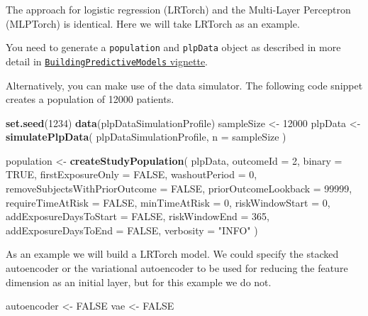 \documentclass[]{article}
\newenvironment{Shaded}{\begin{snugshade}}{\end{snugshade}}
\newcommand{\KeywordTok}[1]{\textcolor[rgb]{0.13,0.29,0.53}{\textbf{#1}}}
\newcommand{\DataTypeTok}[1]{\textcolor[rgb]{0.13,0.29,0.53}{#1}}
\newcommand{\DecValTok}[1]{\textcolor[rgb]{0.00,0.00,0.81}{#1}}
\newcommand{\StringTok}[1]{\textcolor[rgb]{0.31,0.60,0.02}{#1}}
\newcommand{\OtherTok}[1]{\textcolor[rgb]{0.56,0.35,0.01}{#1}}
\newcommand{\NormalTok}[1]{#1}
\begin{document}
The approach for logistic regression (LRTorch) and the Multi-Layer
Perceptron (MLPTorch) is identical. Here we will take LRTorch as an
example.

You need to generate a \texttt{population} and \texttt{plpData} object
as described in more detail in
\href{https://github.com/OHDSI/PatientLevelPrediction/blob/master/inst/doc/BuildingPredictiveModels.pdf}{\texttt{BuildingPredictiveModels}
vignette}.

Alternatively, you can make use of the data simulator. The following
code snippet creates a population of 12000 patients.

\begin{Shaded}
\begin{Highlighting}[]
\KeywordTok{set.seed}\NormalTok{(}\DecValTok{1234}\NormalTok{)}
\KeywordTok{data}\NormalTok{(plpDataSimulationProfile)}
\NormalTok{sampleSize <-}\StringTok{ }\DecValTok{12000}
\NormalTok{plpData <-}\StringTok{ }\KeywordTok{simulatePlpData}\NormalTok{(}
\NormalTok{  plpDataSimulationProfile,}
  \DataTypeTok{n =}\NormalTok{ sampleSize}
\NormalTok{)}

\NormalTok{population <-}\StringTok{ }\KeywordTok{createStudyPopulation}\NormalTok{(}
\NormalTok{  plpData,}
  \DataTypeTok{outcomeId =} \DecValTok{2}\NormalTok{,}
  \DataTypeTok{binary =} \OtherTok{TRUE}\NormalTok{,}
  \DataTypeTok{firstExposureOnly =} \OtherTok{FALSE}\NormalTok{,}
  \DataTypeTok{washoutPeriod =} \DecValTok{0}\NormalTok{,}
  \DataTypeTok{removeSubjectsWithPriorOutcome =} \OtherTok{FALSE}\NormalTok{,}
  \DataTypeTok{priorOutcomeLookback =} \DecValTok{99999}\NormalTok{,}
  \DataTypeTok{requireTimeAtRisk =} \OtherTok{FALSE}\NormalTok{,}
  \DataTypeTok{minTimeAtRisk =} \DecValTok{0}\NormalTok{,}
  \DataTypeTok{riskWindowStart =} \DecValTok{0}\NormalTok{,}
  \DataTypeTok{addExposureDaysToStart =} \OtherTok{FALSE}\NormalTok{,}
  \DataTypeTok{riskWindowEnd =} \DecValTok{365}\NormalTok{,}
  \DataTypeTok{addExposureDaysToEnd =} \OtherTok{FALSE}\NormalTok{,}
  \DataTypeTok{verbosity =} \StringTok{"INFO"}
\NormalTok{)}
\end{Highlighting}
\end{Shaded}

As an example we will build a LRTorch model. We could specify the
stacked autoencoder or the variational autoencoder to be used for
reducing the feature dimension as an initial layer, but for this example
we do not.

\begin{Shaded}
\begin{Highlighting}[]
\NormalTok{autoencoder <-}\StringTok{ }\OtherTok{FALSE}
\NormalTok{vae <-}\StringTok{ }\OtherTok{FALSE}
\end{Highlighting}
\end{Shaded}
\end{document}
